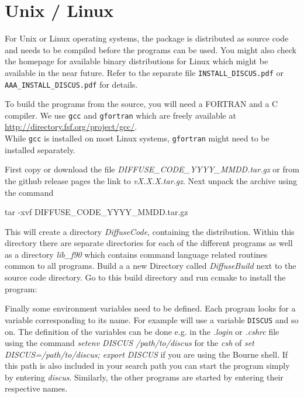 \section{Unix / Linux \label{appa-bunix}}

For Unix or Linux operating systems, the \Discus package is
distributed as source code and needs to be compiled before the
programs can be used. You might also check the \Discus homepage for
available binary distributions for Linux which might be available
in the near future. 
Refer to the separate file {\tt INSTALL\_DISCUS.pdf} 
or {\tt AAA\_INSTALL\_DISCUS.pdf} for details.

To build the programs from the source, you will 
need a FORTRAN and a C compiler. We use {\tt gcc} and {\tt gfortran}
which are freely available at\\ 
\url{http://directory.fsf.org/project/gcc/}. \\
While {\tt gcc} is installed on most Linux systems, {\tt gfortran} might
need to be installed separately.

First copy or download the file {\it DIFFUSE\_CODE\_YYYY\_MMDD.tar.gz} or
from the github release pages the link to {\it vX.X.X.tar.gz}. Next
unpack the archive using the command

\begin{MacVerbatim}
    tar -xvf DIFFUSE_CODE_YYYY_MMDD.tar.gz
\end{MacVerbatim}

This will create a directory {\it DiffuseCode}, containing the
distribution. Within this directory there are separate directories
for each of the different programs as well as a directory {\it lib\_f90}
which contains command language related routines common to all
programs. Build a a new Directory called {\it DiffuseBuild} next to the
source code directory. Go to this build directory and run ccmake to 
install the program:

Finally some environment variables need to be defined. Each program
looks for a variable corresponding to its name. For example \Discus 
will use a variable {\tt DISCUS} and so on. The definition of 
the variables can be done e.g. in the {\it .login} or {\it .cshrc} file 
using the command {\it setenv DISCUS /path/to/discus} for 
the {\it csh} of {\it set DISCUS=/path/to/discus; export DISCUS} if 
you are using the 
Bourne shell. If this path is also included in your search path you can
start the program simply by entering {\it discus}. Similarly, the
other programs are started by entering their respective names.


